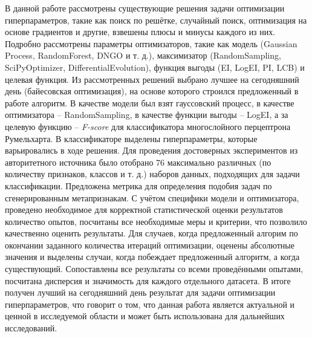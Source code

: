 \documentclass[times,specification,annotation]{itmo-student-thesis}
\begin{document}
	
	\startconclusionpage
	В данной работе рассмотрены существующие решения задачи оптимизации гиперпараметров, такие как поиск по решётке, случайный поиск, оптимизация на основе градиентов и другие, взвешены плюсы и минусы каждого из них. Подробно рассмотрены параметры оптимизаторов, такие как модель (Gaussian Process, RandomForest, DNGO и т. д.), максимизатор (RandomSampling, SciPyOptimizer, DifferentialEvolution), функция выгоды (EI, LogEI, PI, LCB) и целевая функция. Из рассмотренных решений выбрано лучшее на сегодняшний день (байесовская оптимизация), на основе которого строился предложенный в работе алгоритм. В качестве модели был взят гауссовский процесс, в качестве оптимизатора -- RandomSampling, в качестве функции выгоды -- LogEI, а за целевую функцию -- \textit{F-score} для классификатора многослойного перцептрона Румельхарта. В классификаторе выделены гиперпараметры, которые варьировались в ходе решения. Для проведения достоверных экспериментов из авторитетного источника было отобрано 76 максимально различных (по количеству признаков, классов и т. д.) наборов данных, подходящих для задачи классификации. Предложена метрика для определения подобия задач по сгенерированным метапризнакам. С учётом специфики модели и оптимизатора, проведено необходимое для корректной статистической оценки результатов количество опытов, посчитаны все необходимые меры и критерии, что позволило качественно оценить результаты. Для случаев, когда предложенный алгорим по окончании заданного количества итераций оптимизации, оценены абсолютные значения и выделены случаи, когда побеждает предложенный алгоритм, а когда существующий. Сопоставлены все результаты со всеми проведёнными опытами, посчитана дисперсия и значимость для каждого отдельного датасета. В итоге получен лучший на сегодняшний день результат для задачи оптимизации гиперпараметров, что говорит о том, что данная работа является актуальной и ценной в исследуемой области и может быть использована для дальнейших исследований. 
	
	\printmainbibliography
	
	
	\appendix
\end{document}
